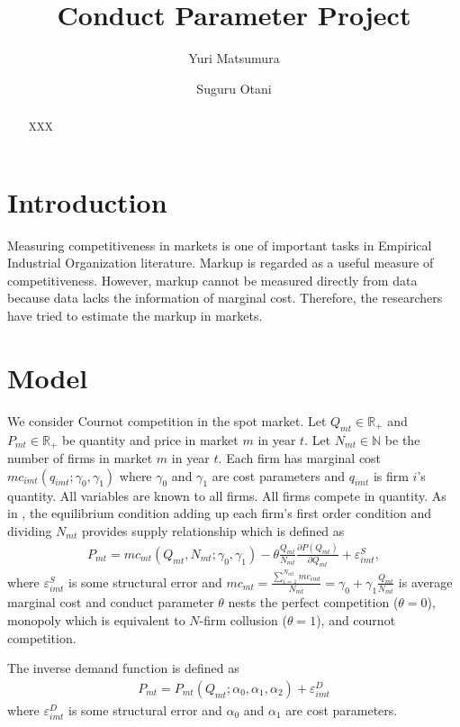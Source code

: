 \documentclass[11pt, a4paper]{article}
\title{Conduct Parameter Project}
\author{Yuri Matsumura \and Suguru Otani}
\begin{document}
\maketitle

\begin{abstract}
    XXX
\end{abstract}

\section{Introduction}
Measuring competitiveness in markets is one of important tasks in Empirical Industrial Organization literature.
Markup is regarded as a useful measure of competitiveness. 
However, markup cannot be measured directly from data because data lacks the information of marginal cost.
Therefore, the researchers have tried to estimate the markup in markets.



\section{Model}
We consider Cournot competition in the spot market. Let $Q_{mt}\in\mathbb{R}_{+}$ and $P_{mt}\in\mathbb{R}_{+}$ be quantity and price in market $m$ in year $t$. Let $N_{mt}\in\mathbb{N}$ be the number of firms in market $m$ in year $t$. Each firm has marginal cost $mc_{imt}(q_{imt};\gamma_0,\gamma_1)$ where $\gamma_0$ and $\gamma_1$ are cost parameters and $q_{imt}$ is firm $i$'s quantity. All variables are known to all firms. All firms compete in quantity. As in \cite{bresnahan1982oligopoly}, the equilibrium condition adding up each firm's first order condition and dividing $N_{mt}$ provides supply relationship which is defined as 
\begin{align}
    P_{m t}=mc_{mt}(Q_{mt},N_{mt};\gamma_0,\gamma_1)-\theta \frac{Q_{mt}}{N_{mt}} \frac{\partial P\left(Q_{m t}\right)}{\partial Q_{m t}}+\varepsilon_{imt}^{S},\label{eq:supply}
\end{align}
where $\varepsilon_{imt}^{S}$ is some structural error and $mc_{mt}=\frac{\sum_{i=1}^{N_{mt}}mc_{imt}}{N_{mt}}=\gamma_0+\gamma_1 \frac{Q_{mt}}{N_{mt}}$ is average marginal cost and conduct parameter $\theta$ nests the perfect competition ($\theta=0$), monopoly which is equivalent to $N$-firm collusion ($\theta=1$), and cournot competition.

The inverse demand function is defined as 
\begin{align}
    P_{mt}=P_{mt}(Q_{mt};\alpha_0,\alpha_1,\alpha_2)+\varepsilon_{imt}^{D}\label{eq:demand}
\end{align}
where $\varepsilon_{imt}^{D}$ is some structural error and $\alpha_0$ and $\alpha_1$ are cost parameters.
\end{document}
